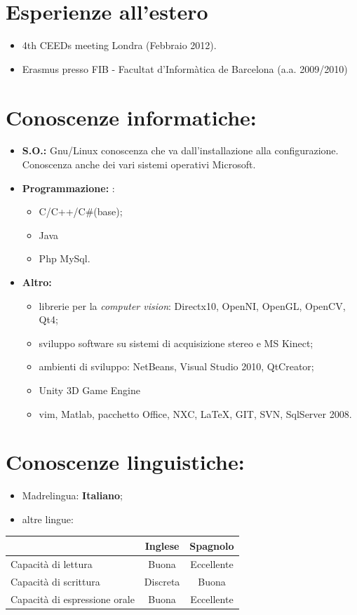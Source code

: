 \documentclass[pdftex,a4paper,10pt,twoside,titlepage,italian]{article}
\begin{document}
\section*{Esperienze all'estero}
\begin{itemize}
	\item 4th CEEDs meeting Londra (Febbraio 2012).
	\item Erasmus presso FIB - Facultat d’Informàtica de Barcelona (a.a. 2009/2010)
\end{itemize}

\section*{Conoscenze informatiche:}
\begin{itemize}
	\item \textbf{S.O.:} Gnu/Linux conoscenza 	che va dall'installazione alla configurazione. Conoscenza anche dei vari 
	sistemi operativi Microsoft.
	\item \textbf{Programmazione: }:
	\begin{itemize}
	\item C/C++/C\#(base);
	\item Java
	\item Php MySql.
	\end{itemize}
	\item \textbf{Altro: }
	\begin{itemize}
	\item librerie per la {\itshape computer vision}: Directx10, OpenNI, OpenGL, OpenCV, Qt4;
	\item sviluppo software su sistemi di acquisizione stereo e MS Kinect;
	\item ambienti di sviluppo: NetBeans, Visual Studio 2010, QtCreator;
	\item Unity 3D Game Engine
	\item vim, Matlab, pacchetto Office, NXC, \LaTeX, GIT, SVN, SqlServer 2008.
	\end{itemize}
\end{itemize}
\section*{Conoscenze linguistiche:}
\begin{itemize}
	\item Madrelingua: \textbf{Italiano};
	\item altre lingue:
\end{itemize}
\begin{center}
	\begin{tabular}{|l|c|c|}
	\hline
	&\textbf{Inglese} & \textbf{Spagnolo}\\
	\hline
	Capacità di lettura & Buona & Eccellente\\
	\hline
	Capacità di scrittura & Discreta & Buona \\
	\hline
	Capacità di espressione orale & Buona & Eccellente \\
	\hline
	\end{tabular}
\end{center}
\end{document}
